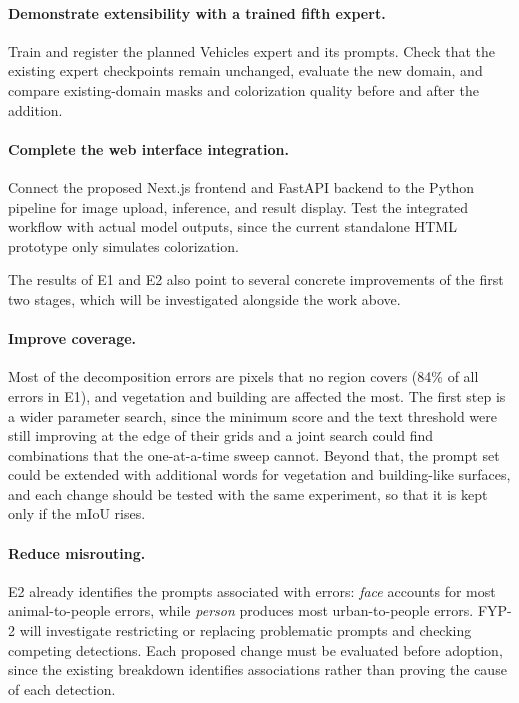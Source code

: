 \documentclass{FastFyp}
\begin{document}
\paragraph{Demonstrate extensibility with a trained fifth expert.} Train
and register the planned Vehicles expert and its prompts. Check that the
existing expert checkpoints remain unchanged, evaluate the new domain, and
compare existing-domain masks and colorization quality before and after
the addition.

\paragraph{Complete the web interface integration.} Connect the proposed
Next.js frontend and FastAPI backend to the Python pipeline for image upload,
inference, and result display. Test the integrated workflow with actual model
outputs, since the current standalone HTML prototype only simulates
colorization.

The results of E1 and E2 also point to several concrete improvements of the
first two stages, which will be investigated alongside the work above.

\paragraph{Improve coverage.} Most of the decomposition errors are pixels that no region covers (84\% of all errors in E1), and vegetation and building are affected the most. The first step is a wider parameter search, since the minimum score and the text threshold were still improving at the edge of their grids and a joint search could find combinations that the one-at-a-time sweep cannot. Beyond that, the prompt set could be extended with additional words for vegetation and building-like surfaces, and each change should be tested with the same experiment, so that it is kept only if the mIoU rises.

\paragraph{Reduce misrouting.} E2 already identifies the prompts associated with errors: \textit{face} accounts for most animal-to-people errors, while \textit{person} produces most urban-to-people errors. FYP-2 will investigate restricting or replacing problematic prompts and checking competing detections. Each proposed change must be evaluated before adoption, since the existing breakdown identifies associations rather than proving the cause of each detection.
\end{document}

